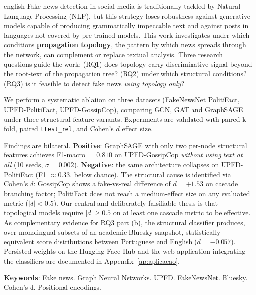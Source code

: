 \documentclass[12pt,oneside,a4paper]{abntex2}
\begin{document}
\begin{resumo}[Abstract]
\begin{otherlanguage*}{english}
Fake-news detection in social media is traditionally tackled by Natural
Language Processing (NLP), but this strategy loses robustness against
generative models capable of producing grammatically impeccable text
and against posts in languages not covered by pre-trained models. This
work investigates under which conditions \textbf{propagation topology},
the pattern by which news spreads through the network, can complement
or replace textual analysis. Three research questions guide the work:
(RQ1) does topology carry discriminative signal beyond the root-text
of the propagation tree? (RQ2) under which structural conditions?
(RQ3) is it feasible to detect fake news \emph{using topology only}?

We perform a systematic ablation on three datasets (FakeNewsNet
PolitiFact, UPFD-PolitiFact, UPFD-GossipCop), comparing GCN, GAT and
GraphSAGE under three structural feature variants. Experiments are
validated with paired k-fold, paired \texttt{ttest\_rel}, and Cohen's
$d$ effect size.

Findings are bilateral. \textbf{Positive}: GraphSAGE with only two
per-node structural features achieves F1-macro $= 0{.}810$ on
UPFD-GossipCop \emph{without using text at all} (10 seeds, $\sigma =
0{.}002$). \textbf{Negative}: the same architecture collapses on
UPFD-PolitiFact (F1 $\approx 0{.}33$, below chance). The structural
cause is identified via Cohen's $d$: GossipCop shows a fake-vs-real
difference of $d = +1{.}53$ on cascade branching factor; PolitiFact
does not reach a medium-effect size on any evaluated metric ($|d| <
0{.}5$). Our central and deliberately falsifiable thesis is that
topological models require $|d| \geq 0{.}5$ on at least one cascade
metric to be effective. As complementary evidence for RQ3 part (b),
the structural classifier produces, over monolingual subsets of an
academic Bluesky snapshot, statistically equivalent score
distributions between Portuguese and English ($d = -0{.}057$).
Persisted weights on the Hugging Face Hub and the web application
integrating the classifiers are documented in
Appendix~\ref{ap:aplicacao}.

\textbf{Keywords}: Fake news. Graph Neural Networks. UPFD. FakeNewsNet.
Bluesky. Cohen's d. Positional encodings.
\end{otherlanguage*}
\end{resumo}


\end{document}
